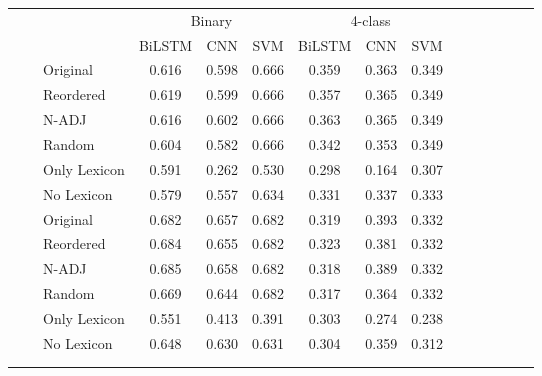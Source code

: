 \documentclass[11pt,a4paper]{article}
\newcommand{\rt}[1]{\rotatebox{90}{#1}}
\begin{document}
\begin{table*}[]
\newcommand{\sep}{\cmidrule(r){4-6}\cmidrule(r){7-9}}
\newcommand{\sepp}{\cmidrule(r){4-4}\cmidrule(r){5-5}\cmidrule(r){6-6}\cmidrule(r){7-7}\cmidrule(r){8-8}\cmidrule(r){9-9}}


\newcommand{\bestproj}[1]{{\setlength{\fboxsep}{0pt}\colorbox{lightblue}{\textit{#1}}}}
\newcommand{\bestoverall}[1]{{\setlength{\fboxsep}{0pt}\colorbox{lightgreen}{\textbf{#1}}}}

\setlength\tabcolsep{10pt}
\renewcommand*{\arraystretch}{0.8}
\centering\small
\begin{tabular}{lllcccccccccccc}
\toprule
&& & \multicolumn{3}{c}{Binary} & \multicolumn{3}{c}{4-class} \\
\sep
\multirow{14}{*}{\rt{Bilingual Word Embeddings}} 
	& \multirow{6}{*}{\rt{EN-ES}}
	    && BiLSTM & CNN & SVM & BiLSTM & CNN & SVM \\
	    \cmidrule(r){4-4}\cmidrule(r){5-5}\cmidrule(r){6-6}\cmidrule(r){7-7}\cmidrule(r){8-8}\cmidrule(r){9-9}
		&& Original 	 & 0.616 & 0.598 & 0.666 & 0.359 & 0.363 & 0.349 \\ 
		&& Reordered  & 0.619 & 0.599 & 0.666 & 0.357 & 0.365 & 0.349 \\ 
		&& N-ADJ  & 0.616 & 0.602 & 0.666 & 0.363 & 0.365 & 0.349 \\ 
		&& Random  & 0.604 & 0.582 & 0.666 & 0.342 & 0.353 & 0.349 \\ 
		&& Only Lexicon  & 0.591 & 0.262 & 0.530 & 0.298 & 0.164 & 0.307 \\ 
		&& No Lexicon  & 0.579 & 0.557 & 0.634 & 0.331 & 0.337 & 0.333 \\ 
	\sepp
	& \multirow{6}{*}{\rt{EN-CA}}
  		& Original & 0.682 & 0.657 & 0.682 & 0.319 & 0.393 & 0.332 \\ 
		&& Reordered  & 0.684 & 0.655 & 0.682 & 0.323 & 0.381 & 0.332 \\ 
		&& N-ADJ &  0.685 & 0.658 & 0.682 & 0.318 & 0.389 & 0.332 \\ 
		&& Random & 0.669 & 0.644 & 0.682 & 0.317 & 0.364 & 0.332 \\ 
		&& Only Lexicon  & 0.551 & 0.413 & 0.391 & 0.303 & 0.274 & 0.238 \\ 
		&& No Lexicon & 0.648 & 0.630 & 0.631 & 0.304 & 0.359 & 0.312 \\ 


\\
\hline \\


\end{tabular}
\end{table*}
\end{document}
